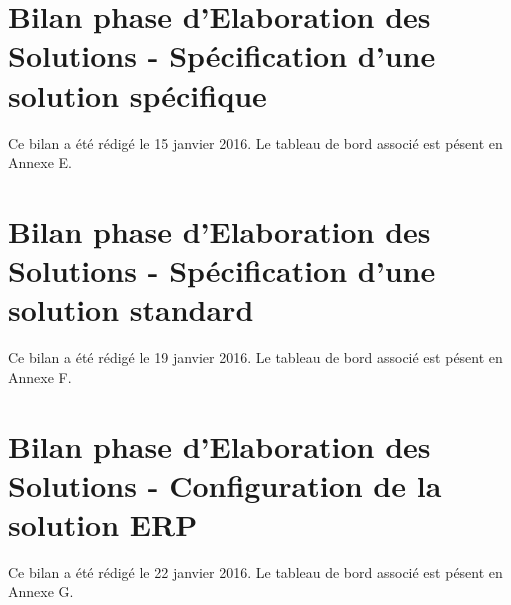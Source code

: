 \setcounter{section}{0}


\part{Bilan phase d'Elaboration des Solutions - Spécification d'une solution spécifique}

Ce bilan a été rédigé le 15 janvier 2016. Le tableau de bord associé est pésent en Annexe E.

\setcounter{section}{0}


\part{Bilan phase d'Elaboration des Solutions - Spécification d'une solution standard}

Ce bilan a été rédigé le 19 janvier 2016. Le tableau de bord associé est pésent en Annexe F.

\setcounter{section}{0}


\part{Bilan phase d'Elaboration des Solutions - Configuration de la solution ERP}

Ce bilan a été rédigé le 22 janvier 2016. Le tableau de bord associé est pésent en Annexe G.

\setcounter{section}{0}



